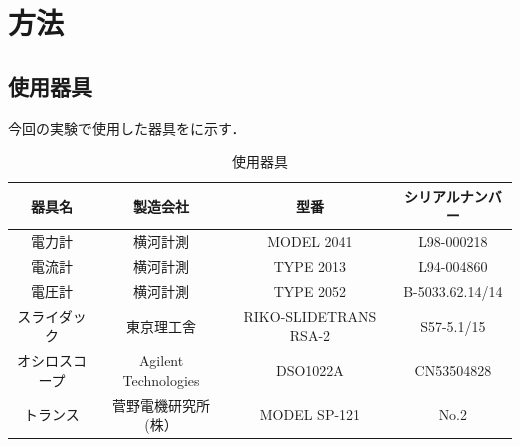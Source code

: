 \clearpage

\section{方法}
\subsection{使用器具}
今回の実験で使用した器具をに示す．
\begin{table}[h]
\centering
\caption{使用器具}
\label{tab:kigu}
\begin{tabular}{cccc}
\hline
器具名     & 製造会社                 & 型番                    & シリアルナンバー        \\ \hline
電力計     & 横河計測                 & MODEL 2041            & L98-000218      \\
電流計     & 横河計測                 & TYPE 2013             & L94-004860      \\
電圧計     & 横河計測                 & TYPE 2052             & B-5033.62.14/14 \\
スライダック  & 東京理工舎                & RIKO-SLIDETRANS RSA-2 & S57-5.1/15      \\
オシロスコープ & Agilent Technologies & DSO1022A              & CN53504828      \\
トランス    & 菅野電機研究所(株）           & MODEL SP-121          & No.2            \\ \hline
\end{tabular}
\end{table}
